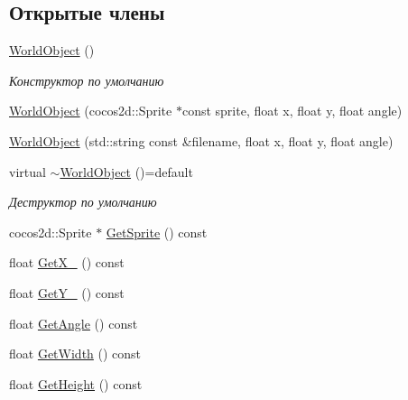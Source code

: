 \subsection*{Открытые члены}
\begin{DoxyCompactItemize}
\item 
\mbox{\label{classrtm_1_1_world_object_af44479be3cee7dd4de4d197adbb5afab}} 
\hyperlink{classrtm_1_1_world_object_af44479be3cee7dd4de4d197adbb5afab}{World\+Object} ()
\begin{DoxyCompactList}\small\item\em Конструктор по умолчанию \end{DoxyCompactList}\item 
\hyperlink{classrtm_1_1_world_object_a1a1196480079afe397f64055f333f83c}{World\+Object} (cocos2d\+::\+Sprite $\ast$const sprite, float x, float y, float angle)
\item 
\hyperlink{classrtm_1_1_world_object_a4462c860b41708d4570352dc3372064e}{World\+Object} (std\+::string const \&filename, float x, float y, float angle)
\item 
\mbox{\label{classrtm_1_1_world_object_a06dbc49bfcfa403a842ebe1f316763e0}} 
virtual \hyperlink{classrtm_1_1_world_object_a06dbc49bfcfa403a842ebe1f316763e0}{$\sim$\+World\+Object} ()=default
\begin{DoxyCompactList}\small\item\em Деструктор по умолчанию \end{DoxyCompactList}\item 
cocos2d\+::\+Sprite $\ast$ \hyperlink{classrtm_1_1_world_object_af0284b8fdc5a7ff8893d020d630a7fe5}{Get\+Sprite} () const
\item 
float \hyperlink{classrtm_1_1_world_object_a31f148a74be54e4f1ccbf41fc8424552}{Get\+X\+\_\+} () const
\item 
float \hyperlink{classrtm_1_1_world_object_af558d23ff82794c8ace17b8aeefaf5bb}{Get\+Y\+\_\+} () const
\item 
float \hyperlink{classrtm_1_1_world_object_ae9af0e03a3f49720b38ec69191c8d237}{Get\+Angle} () const
\item 
float \hyperlink{classrtm_1_1_world_object_a36a9cf3cce5c76f88164e0c790675a1e}{Get\+Width} () const
\item 
float \hyperlink{classrtm_1_1_world_object_ac1ab514e4556b3d8b9d4ffda5eba9db2}{Get\+Height} () const
\end{DoxyCompactItemize}

